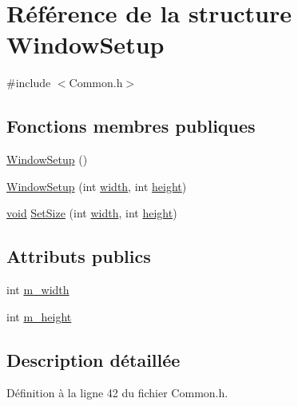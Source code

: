 \hypertarget{struct_window_setup}{\section{Référence de la structure Window\-Setup}
\label{struct_window_setup}
}


{\ttfamily \#include $<$Common.\-h$>$}

\subsection*{Fonctions membres publiques}
\begin{DoxyCompactItemize}
\item 
\hyperlink{struct_window_setup_a93c67cb70c7e8e6ab3d54464f4ed0eec}{Window\-Setup} ()
\item 
\hyperlink{struct_window_setup_ad242e2ae9c4a41e8f7479fb1def6a7c5}{Window\-Setup} (int \hyperlink{gl_8h_a30a197eaed803ac3cd1b444d4c972354}{width}, int \hyperlink{gl_8h_aab021b2df174b06135ca6744356dcf34}{height})
\item 
\hyperlink{glu_8h_a4292190e3f1f6b373a760c7d9316ad3c}{void} \hyperlink{struct_window_setup_a8f68af6ffcc41489888f89a9313b9208}{Set\-Size} (int \hyperlink{gl_8h_a30a197eaed803ac3cd1b444d4c972354}{width}, int \hyperlink{gl_8h_aab021b2df174b06135ca6744356dcf34}{height})
\end{DoxyCompactItemize}
\subsection*{Attributs publics}
\begin{DoxyCompactItemize}
\item 
int \hyperlink{struct_window_setup_a79928e5defb03915ceb701ea9d6e3284}{m\-\_\-width}
\item 
int \hyperlink{struct_window_setup_ae015795573cf804d632bda194dbdc437}{m\-\_\-height}
\end{DoxyCompactItemize}


\subsection{Description détaillée}


Définition à la ligne 42 du fichier Common.\-h.



